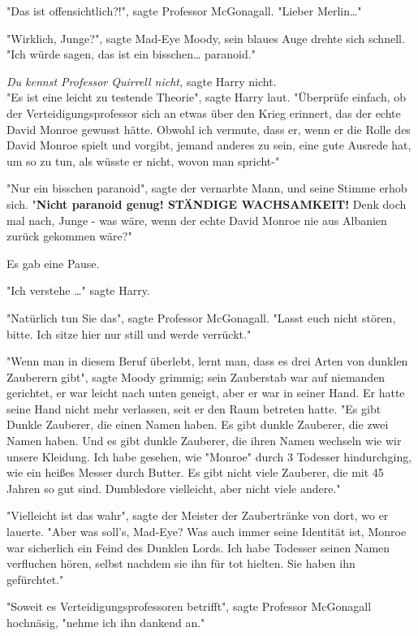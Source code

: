 {"Das ist offensichtlich?!", sagte Professor McGonagall. "Lieber Merlin…"

"Wirklich, Junge?", sagte Mad-Eye Moody, sein blaues Auge drehte sich schnell. "Ich würde sagen, das ist ein bisschen… paranoid."

\emph{Du kennst Professor Quirrell nicht,} sagte Harry nicht.\\ "Es ist eine leicht zu testende Theorie", sagte Harry laut. "Überprüfe einfach, ob der Verteidigungsprofessor sich an etwas über den Krieg erinnert, das der echte David Monroe gewusst hätte. Obwohl ich vermute, dass er, wenn er die Rolle des David Monroe spielt und vorgibt, jemand anderes zu sein, eine gute Ausrede hat, um so zu tun, als wüsste er nicht, wovon man spricht-"

"Nur ein bisschen paranoid", sagte der vernarbte Mann, und seine Stimme erhob sich. "\textbf{Nicht paranoid genug! STÄNDIGE WACHSAMKEIT!} Denk doch mal nach, Junge - was wäre, wenn der echte David Monroe nie aus Albanien zurück gekommen wäre?"

Es gab eine Pause.

"Ich verstehe …" sagte Harry.

"Natürlich tun Sie das", sagte Professor McGonagall. "Lasst euch nicht stören, bitte. Ich sitze hier nur still und werde verrückt."

"Wenn man in diesem Beruf überlebt, lernt man, dass es drei Arten von dunklen Zauberern gibt", sagte Moody grimmig; sein Zauberstab war auf niemanden gerichtet, er war leicht nach unten geneigt, aber er war in seiner Hand. Er hatte seine Hand nicht mehr verlassen, seit er den Raum betreten hatte. "Es gibt Dunkle Zauberer, die einen Namen haben. Es gibt dunkle Zauberer, die zwei Namen haben. Und es gibt dunkle Zauberer, die ihren Namen wechseln wie wir unsere Kleidung. Ich habe gesehen, wie "Monroe" durch 3 Todesser hindurchging, wie ein heißes Messer durch Butter. Es gibt nicht viele Zauberer, die mit 45 Jahren so gut sind. Dumbledore vielleicht, aber nicht viele andere."

"Vielleicht ist das wahr", sagte der Meister der Zaubertränke von dort, wo er lauerte. "Aber was soll's, Mad-Eye? Was auch immer seine Identität ist, Monroe war sicherlich ein Feind des Dunklen Lords. Ich habe Todesser seinen Namen verfluchen hören, selbst nachdem sie ihn für tot hielten. Sie haben ihn gefürchtet."

"Soweit es Verteidigungsprofessoren betrifft", sagte Professor McGonagall hochnäsig, "nehme ich ihn dankend an."

}
